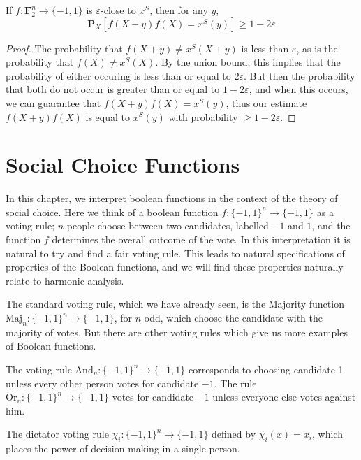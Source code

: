 \begin{theorem}
    If $f: \mathbf{F}_2^n \to \{ -1, 1 \}$ is $\varepsilon$-close to $x^S$, then for any $y$,
    \[ \mathbf{P}_X[f(X + y)f(X) = x^S(y)] \geq 1 - 2 \varepsilon \]
\end{theorem}
\begin{proof}
    The probability that $f(X + y) \neq x^S(X + y)$ is less than $\varepsilon$, as is the probability that $f(X) \neq x^S(X)$. By the union bound, this implies that the probability of either occuring is less than or equal to $2\varepsilon$. But then the probability that both do not occur is greater than or equal to $1 - 2\varepsilon$, and when this occurs, we can guarantee that $f(X + y)f(X) = x^S(y)$, thus our estimate $f(X + y)f(X)$ is equal to $x^S(y)$ with probability $\geq 1 - 2 \varepsilon$.
\end{proof}

\chapter{Social Choice Functions}

In this chapter, we interpret boolean functions in the context of the theory of social choice. Here we think of a boolean function $f: \{ -1, 1 \}^n \to \{ -1, 1 \}$ as a voting rule; $n$ people choose between two candidates, labelled $-1$ and $1$, and the function $f$ determines the overall outcome of the vote. In this interpretation it is natural to try and find a fair voting rule. This leads to natural specifications of properties of the Boolean functions, and we will find these properties naturally relate to harmonic analysis.

The standard voting rule, which we have already seen, is the Majority function $\text{Maj}_n: \{ -1, 1 \}^n \to \{ -1, 1 \}$, for $n$ odd, which choose the candidate with the majority of votes. But there are other voting rules which give us more examples of Boolean functions.

\begin{example}
    The voting rule $\text{And}_n: \{ -1, 1 \}^n \to \{ -1, 1 \}$ corresponds to choosing candidate 1 unless every other person votes for candidate $-1$. The rule $\text{Or}_n: \{ -1, 1 \}^n \to \{ -1, 1 \}$ votes for candidate $-1$ unless everyone else votes against him.
\end{example}

\begin{example}
    The dictator voting rule $\chi_i: \{ -1, 1 \}^n \to \{ -1, 1 \}$ defined by $\chi_i(x) = x_i$, which places the power of decision making in a single person.
\end{example}

